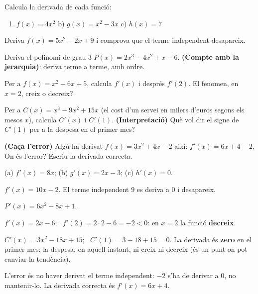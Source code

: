 \begin{exercicis}
\begin{exlist}
  \item Calcula la derivada de cada funció:
        \begin{enumerate}[label=\alph*), leftmargin=1.6em, topsep=2pt]
          \item $f(x)=4x^2$ \hfill b) $g(x)=x^2-3x$ \hfill c) $h(x)=7$
        \end{enumerate}
  \item Deriva $f(x)=5x^2-2x+9$ i comprova que el terme independent desapareix.
  \item Deriva el polinomi de grau 3 $P(x)=2x^3-4x^2+x-6$.
        \textbf{(Compte amb la jerarquia)}: deriva terme a terme, amb ordre.
  \item Per a $f(x)=x^2-6x+5$, calcula $f'(x)$ i després $f'(2)$. El fenomen, en $x=2$,
        creix o decreix?
  \item Per a $C(x)=x^3-9x^2+15x$ (el cost d'un servei en milers d'euros segons els
        mesos $x$), calcula $C'(x)$ i $C'(1)$. \textbf{(Interpretació)} Què vol dir el
        signe de $C'(1)$ per a la despesa en el primer mes?
  \item \textbf{(Caça l'error)} Algú ha derivat $f(x)=3x^2+4x-2$ així:
        $f'(x)=6x+4-2$. On és l'error? Escriu la derivada correcta.
\end{exlist}
\end{exercicis}

\begin{solucions}
\begin{sollist}
  \item (a) $f'(x)=8x$; \quad (b) $g'(x)=2x-3$; \quad (c) $h'(x)=0$.
  \item $f'(x)=10x-2$. El terme independent $9$ es deriva a $0$ i desapareix.
  \item $P'(x)=6x^2-8x+1$.
  \item $f'(x)=2x-6$; \ $f'(2)=2\cdot 2-6=-2<0$: en $x=2$ la funció \textbf{decreix}.
  \item $C'(x)=3x^2-18x+15$; \ $C'(1)=3-18+15=0$. La derivada és \textbf{zero} en el
        primer mes: la despesa, en aquell instant, ni creix ni decreix (és un punt on
        pot canviar la tendència).
  \item L'error és no haver derivat el terme independent: $-2$ s'ha de derivar a $0$, no
        mantenir-lo. La derivada correcta és $f'(x)=6x+4$.
\end{sollist}
\end{solucions}
